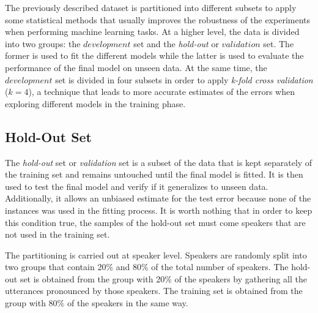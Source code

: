 
The previously described dataset is partitioned into different subsets
to apply some statistical methods that usually
improves the robustness of the experiments
when performing machine learning tasks.
At a higher level,
the data is divided into two groups: the $development$ set and the \textit{hold-out} or $validation$ set. The former is used to fit the different models while the latter is used
to evaluate the performance
of the final model on unseen data. At the same time, the $development$ set is divided in four
subsets in order to apply \textit{k-fold cross validation} ($k=4$), a
technique that leads to more accurate estimates of the errors when exploring different
models in the training phase.

\subsection{Hold-Out Set}

The \textit{hold-out} set or \textit{validation} set is a subset of the data that is kept
separately of the training set and remains untouched until the final model is fitted. It is
then used to test the final model and verify if it generalizes to unseen data.
Additionally, it allows
an unbiased estimate for the test error because none of the instances was used in the
fitting process. It is worth nothing that in order to keep this condition true, the samples
of the hold-out set must come speakers that are not used in the training set.

The partitioning is carried out at speaker level. Speakers are randomly split into two groups
that contain 20\% and 80\% of the total number of speakers. The hold-out set
is obtained from the group with 20\% of the speakers by gathering all the utterances pronounced
by those speakers. The training set is obtained from the
group with 80\% of the speakers in the same way.
